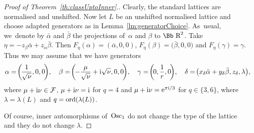 \documentclass[pdftex]{sigma}
\newcommand\RR{{\mbox{\Bb R}}}
\newcommand\cF{{\mathcal F}}
\newcommand{\Osc}{{\rm Osc}}
\newcommand{\ord}{{\rm ord}}
\numberwithin{equation}{section}
\begin{document}
\begin{proof}[Proof of Theorem~\ref{th:classUptoInner}.]
Clearly, the standard lattices are normalised and unshifted. Now let $L$ be an unshifted normalised lattice and choose adapted generators as in Lemma~\ref{lm:generatorChoice}. As~usual, we~denote by $\bar \alpha$ and $\bar \beta$ the projections of~$\alpha$ and $\beta$ to $\RR^2$.
Take $\eta=-z_\beta\bar\alpha+z_\alpha\bar\beta$. Then $F_{\eta}(\alpha)=(\bar\alpha,0,0)$, $F_{\eta}(\beta)=\big(\bar\beta,0,0\big)$ and $F_{\eta}(\gamma)=\gamma$. Thus we may assume that we have generators
\begin{gather}\label{choice2}
\alpha=\!\bigg(\!\frac 1{\sqrt\nu},0,0\!\bigg),\quad
\beta=\!\bigg(\!{-}\frac{\mu}{\sqrt\nu}+{\rm i}\sqrt\nu,0,0\!\bigg),\quad
\gamma=\!\bigg(\!0,\frac 1r,0\!\bigg),\quad
\delta=\!\big(x_\delta\bar\alpha+y_\delta\bar\beta,z_\delta,\lambda\big),\!\!
\end{gather}
where $\mu+{\rm i}\nu\in\cF$, $\mu+{\rm i}\nu={\rm i}$ for $q=4$ and $\mu+{\rm i}\nu= {\rm e}^{\pi {\rm i}/3}$ for $q\in\{3,6\}$, where $\lambda=\lambda(L)$ and $q=\ord(\lambda(L))$.

Of course, inner automorphisms of~$\Osc_1$ do not change the type of the lattice and they do not change $\lambda$.


\end{proof}
\end{document}
